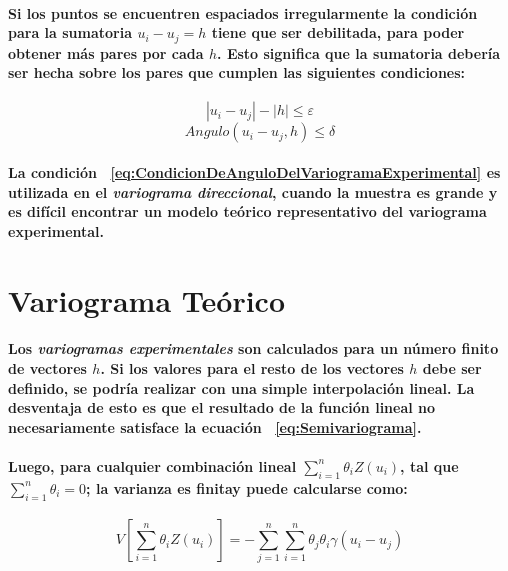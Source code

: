 \paragraph*{
Si los puntos se encuentren espaciados irregularmente la condición para la sumatoria $u_i -u_j = h$ tiene que ser debilitada, para poder obtener más pares por cada $h$. Esto significa que la sumatoria debería ser hecha sobre los pares que cumplen las siguientes condiciones\footnotemark[14]:
}
\begin{equation}
|u_i - u_j| - |h| \leq \varepsilon
\end{equation}
\begin{equation}
\label{eq:CondicionDeAnguloDelVariogramaExperimental}
Angulo(u_i - u_j, h) \leq \delta
\end{equation}
\paragraph{
La condición ~\ref{eq:CondicionDeAnguloDelVariogramaExperimental} es utilizada en el \emph{variograma direccional}, cuando la muestra es grande y es difícil encontrar un modelo teórico representativo del variograma experimental.
}



\section{Variograma Teórico}
\label{sec:VariogramaTeorico}
\paragraph{
Los \emph{variogramas experimentales} son calculados para un número finito de vectores $h$. Si los valores para el resto de los vectores $h$ debe ser definido, se podría realizar con una simple interpolación lineal. La desventaja de esto es que el resultado de la función lineal no necesariamente satisface la ecuación ~\ref{eq:Semivariograma}.
}
\paragraph*{
Luego, para cualquier combinación lineal $\sum_{i=1}^n\theta_i Z(u_i)$, tal que $\sum_{i=1}^n\theta_i = 0$; la varianza es finita\footnotemark[15] y puede calcularse como:
}
\begin{equation}
\label{eq:VarianzaFinitaDelVariogramaTeorico}
V[\sum_{i=1}^n\theta_i Z(u_i)] = - \sum_{j=1}^n \sum_{i=1}^n \theta_j \theta_i \gamma(u_i - u_j)
\end{equation}
